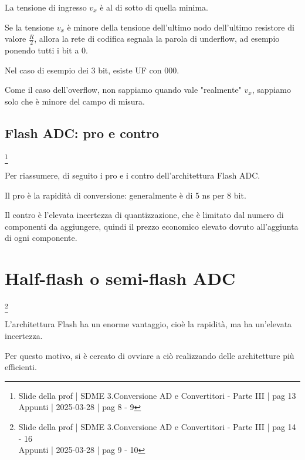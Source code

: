 La tensione di ingresso $v_x$ è al di sotto di quella minima. \newline 

Se la tensione $v_x$ è minore della tensione dell'ultimo nodo dell'ultimo resistore di valore $\frac{R}{2}$, 
allora la rete di codifica segnala la parola di underflow, ad esempio ponendo tutti i bit a 0. \newline 

Nel caso di esempio dei 3 bit, esiste UF con 000. \newline 

Come il caso dell'overflow, non sappiamo quando vale "realmente" $v_x$, sappiamo solo che è minore del campo di misura. \newline 


\newpage 

\subsection{Flash ADC: pro e contro}
\footnote{Slide della prof | SDME 3.Conversione AD e Convertitori - Parte III | pag 13 \\  
Appunti | 2025-03-28 | pag 8 - 9}

Per riassumere, di seguito i pro e i contro dell'architettura Flash ADC. \newline 

Il pro è la rapidità di conversione: generalmente è di 5 ns per 8 bit. \newline 

Il contro è l'elevata incertezza di quantizzazione, che è limitato dal numero di componenti da aggiungere, quindi il prezzo economico elevato 
dovuto all'aggiunta di ogni componente. \newline 

\newpage 

\section{Half-flash o semi-flash ADC}
\footnote{Slide della prof | SDME 3.Conversione AD e Convertitori - Parte III | pag 14 - 16 \\  
Appunti | 2025-03-28 | pag 9 - 10}

L'architettura Flash ha un enorme vantaggio, cioè la rapidità, ma ha un'elevata incertezza. \newline 

Per questo motivo, si è cercato di ovviare a ciò realizzando delle architetture più efficienti. \newline 

